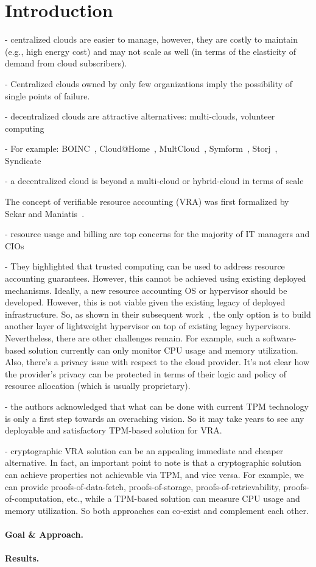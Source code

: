 \section{Introduction} \label{sect:intro}

- centralized clouds are easier to manage, however, they are costly to maintain (e.g., high energy cost) and may not scale as well (in terms of the elasticity of demand from cloud subscribers).

- Centralized clouds owned by only few organizations imply the possibility of single points of failure.

- decentralized clouds are attractive alternatives: multi-clouds, volunteer computing

- For example: BOINC~\cite{BOINC}, Cloud@Home~\cite{DP12}, MultCloud~\cite{MultCloud}, Symform~\cite{Symform}, Storj~\cite{Storj}, Syndicate~\cite{Syndicate}

- a decentralized cloud is beyond a multi-cloud or hybrid-cloud in terms of scale

The concept of verifiable resource accounting (VRA) was first formalized by Sekar and Maniatis~\cite{SM11}.

- resource usage and billing are top concerns for the majority of IT managers and CIOs 

- They highlighted that trusted computing can be used to address resource accounting guarantees. However, this cannot be achieved using existing deployed mechanisms. Ideally, a new resource accounting OS or hypervisor should be developed. However, this is not viable given the existing legacy of deployed infrastructure. So, as shown in their subsequent work~\cite{CMP+13}, the only option is to build another layer of lightweight hypervisor on top of existing legacy hypervisors. Nevertheless, there are other challenges remain. For example, such a software-based solution currently can only monitor CPU usage and memory utilization. Also, there's a privacy issue with respect to the cloud provider. It's not clear how the provider's privacy can be protected in terms of their logic and policy of resource allocation (which is usually proprietary).

- the authors acknowledged that what can be done with current TPM technology is only a first step towards an overaching vision. So it may take years to see any deployable and satisfactory TPM-based solution for VRA.

- cryptographic VRA solution can be an appealing immediate and cheaper alternative. In fact, an important point to note is that a cryptographic solution can achieve properties not achievable via TPM, and vice versa. For example, we can provide proofs-of-data-fetch, proofs-of-storage, proofs-of-retrievability, proofs-of-computation, etc., while a TPM-based solution can measure CPU usage and memory utilization. So both approaches can co-exist and complement each other.


\paragraph{Goal \& Approach.}


\paragraph{Results.}



